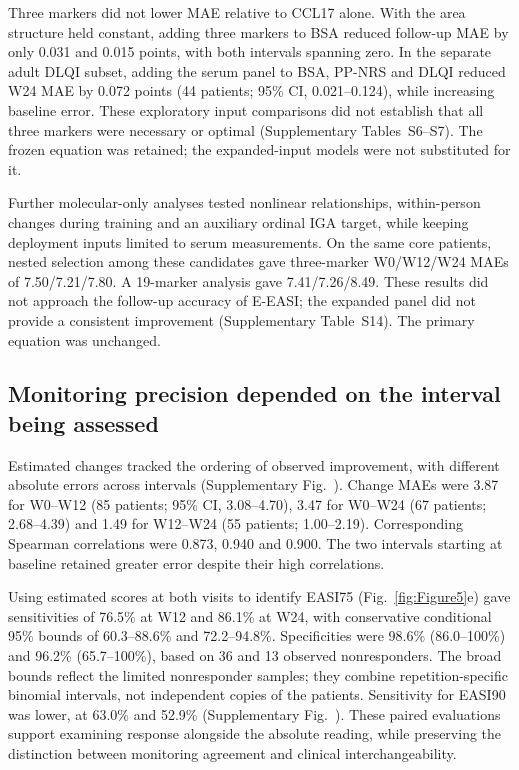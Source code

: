
Three markers did not lower MAE relative to CCL17 alone. With the area structure held constant, adding three markers to BSA reduced follow-up MAE by only 0.031 and 0.015 points, with both intervals spanning zero. In the separate adult DLQI subset, adding the serum panel to BSA, PP-NRS and DLQI reduced W24 MAE by 0.072 points (44 patients; 95\% CI, 0.021--0.124), while increasing baseline error. These exploratory input comparisons did not establish that all three markers were necessary or optimal (Supplementary Tables~S6--S7). The frozen equation was retained; the expanded-input models were not substituted for it.

Further molecular-only analyses tested nonlinear relationships, within-person changes during training and an auxiliary ordinal IGA target, while keeping deployment inputs limited to serum measurements. On the same core patients, nested selection among these candidates gave three-marker W0/W12/W24 MAEs of 7.50/7.21/7.80. A 19-marker analysis gave 7.41/7.26/8.49. These results did not approach the follow-up accuracy of E-EASI; the expanded panel did not provide a consistent improvement (Supplementary Table~S14). The primary equation was unchanged.

\subsection{Monitoring precision depended on the interval being assessed}
Estimated changes tracked the ordering of observed improvement, with different absolute errors across intervals (Supplementary Fig.~). Change MAEs were 3.87 for W0--W12 (85 patients; 95\% CI, 3.08--4.70), 3.47 for W0--W24 (67 patients; 2.68--4.39) and 1.49 for W12--W24 (55 patients; 1.00--2.19). Corresponding Spearman correlations were 0.873, 0.940 and 0.900. The two intervals starting at baseline retained greater error despite their high correlations.

Using estimated scores at both visits to identify EASI75 (Fig.~\ref{fig:Figure5}e) gave sensitivities of 76.5\% at W12 and 86.1\% at W24, with conservative conditional 95\% bounds of 60.3--88.6\% and 72.2--94.8\%. Specificities were 98.6\% (86.0--100\%) and 96.2\% (65.7--100\%), based on 36 and 13 observed nonresponders. The broad bounds reflect the limited nonresponder samples; they combine repetition-specific binomial intervals, not independent copies of the patients. Sensitivity for EASI90 was lower, at 63.0\% and 52.9\% (Supplementary Fig.~). These paired evaluations support examining response alongside the absolute reading, while preserving the distinction between monitoring agreement and clinical interchangeability.

